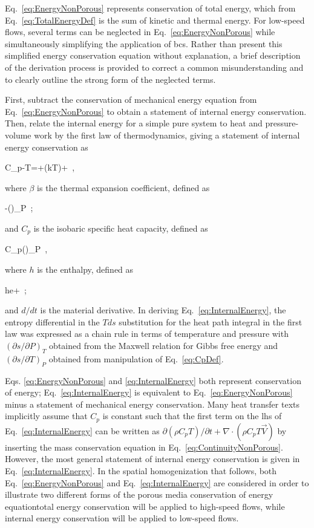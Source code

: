 Eq.\ \eqref{eq:EnergyNonPorous} represents conservation of total energy, which from Eq.\ \eqref{eq:TotalEnergyDef} is the sum of kinetic and thermal energy. For low-speed flows, several terms can be neglected in Eq.\ \eqref{eq:EnergyNonPorous} while simultaneously simplifying the application of \glspl{bc}. Rather than present this simplified energy conservation equation without explanation, a brief description of the derivation process is provided to correct a common misunderstanding and to clearly outline the strong form of the neglected terms.

First, subtract the conservation of mechanical energy equation from Eq.\ \eqref{eq:EnergyNonPorous} to obtain a statement of internal energy conservation. Then, relate the internal energy for a simple pure system to heat and pressure-volume work by the first law of thermodynamics, giving a statement of internal energy conservation as

\beq
\label{eq:InternalEnergy}
\rho C_{p}-\beta T=\tau\colon\nabla{}+\nabla\cdot(k\nabla T)+\ ,
\eeq

\noindent where \(\beta\) is the thermal expansion coefficient, defined as

\beq
\label{eq:BetaDef}
\beta\equiv-\left(\right)_P\ ;
\eeq

\noindent and \(C_p\) is the isobaric specific heat capacity, defined as

\beq
\label{eq:CpDef}
C_p\equiv\left(\right)_P\ ,
\eeq

\noindent where \(h\) is the enthalpy, defined as

\beq
\label{eq:EnthalpyDef}
h\equiv e+\ ;
\eeq

\noindent and \(d/dt\) is the material derivative. In deriving Eq.\ \eqref{eq:InternalEnergy}, the entropy differential in the \(Tds\) substitution for the heat path integral in the first law was expressed as a chain rule in terms of temperature and pressure with \((\partial s/\partial P)_T\) obtained from the Maxwell relation for Gibbs free energy and \((\partial s/\partial T)_P\) obtained from manipulation of Eq.\ \eqref{eq:CpDef}. 

Eqs. \eqref{eq:EnergyNonPorous} and \eqref{eq:InternalEnergy} both represent conservation of energy; Eq.\ \eqref{eq:InternalEnergy} is equivalent to Eq.\ \eqref{eq:EnergyNonPorous} minus a statement of mechanical energy conservation. Many heat transfer texts implicitly assume that \(C_p\) is constant such that the first term on the \gls{lhs} of Eq.\ \eqref{eq:InternalEnergy} can be written as \(\partial(\rho C_{p}T)/\partial t+\nabla\cdot(\rho C_pT\vec{V})\) by inserting the mass conservation equation in Eq.\ \eqref{eq:ContinuityNonPorous}. However, the most general statement of internal energy conservation is given in Eq.\ \eqref{eq:InternalEnergy}. In the spatial homogenization that follows, both Eq.\ \eqref{eq:EnergyNonPorous} and Eq.\ \eqref{eq:InternalEnergy} are considered in order to illustrate two different forms of the porous media conservation of energy equation\mdash total energy conservation will be applied to high-speed flows, while internal energy conservation will be applied to low-speed flows.

